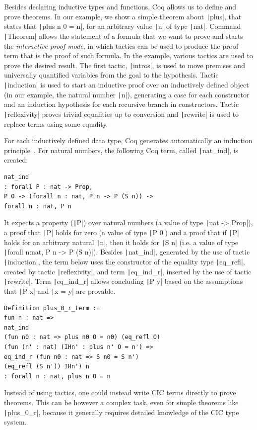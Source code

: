 \documentclass[oneside,12pt]{scrbook}
\theoremstyle{definition}
\newcommand{\coq}[1]{\texttt|#1|}
\theoremstyle{plain}
\theoremstyle{definition}
\begin{document}
Besides declaring inductive types and functions, Coq allows us to
define and prove theorems. In our example, we show a simple theorem
about \coq{plus}, that states that
\coq{plus n 0 = n}, for an arbitrary value \coq{n} of type
\coq{nat}. Command \coq{Theorem} allows the statement of a
formula that we want to prove and starts the \emph{interactive proof mode}, 
in which tactics can be used to produce the proof term that
is the proof of such formula. In the example, various tactics are
used to prove the desired result.  The first tactic, \coq{intros}, is
used to move premises and universally quantified variables from the
goal to the hypothesis. Tactic \coq{induction} is used to start an inductive
proof over an inductively defined object (in our example,
the natural number \coq{n}), generating a case for each constructor and
an induction hypothesis for each recursive branch in constructors.
Tactic \coq{reflexivity} proves trivial equalities up to conversion and
\coq{rewrite} is used to replace terms using some equality. 

For each inductively defined data type,
Coq generates automatically an induction principle~\cite[Chapter
14]{Bertot2010}. For natural numbers, the following Coq term, called
\coq{nat_ind}, is created: 
\begin{verbatim}
nat_ind
: forall P : nat -> Prop,
P O -> (forall n : nat, P n -> P (S n)) ->
forall n : nat, P n
\end{verbatim}
It expects a property (\coq{P}) over natural numbers (a value of type
\coq{nat -> Prop}), a proof that \coq{P} holds for zero (a value of
type \coq{P 0}) and a proof that if \coq{P} holds for an arbitrary
natural \coq{n}, then it holds for \coq{S n} (i.e. a value of type
\coq{forall n:nat, P n -> P (S n)}). Besides \coq{nat_ind}, generated by
the use of tactic \coq{induction}, the term below 
uses the constructor of the equality
type \coq{eq_refl}, created by tactic \coq{reflexivity}, and term
\coq{eq_ind_r}, inserted by the use of tactic \coq{rewrite}. Term
\coq{eq_ind_r} allows concluding \coq{P y} based on the assumptions
that \coq{P x} and \coq{x = y} are provable.

\begin{verbatim}
Definition plus_0_r_term :=
fun n : nat =>
nat_ind
(fun n0 : nat => plus n0 O = n0) (eq_refl O)
(fun (n' : nat) (IHn' : plus n' O = n') =>
eq_ind_r (fun n0 : nat => S n0 = S n')
(eq_refl (S n')) IHn') n
: forall n : nat, plus n O = n
\end{verbatim}  

Instead of using tactics, one could instead write CIC terms directly
to prove theorems.  This can be however a complex task, even for
simple theorems like \coq{plus_0_r}, because it generally requires
detailed knowledge of the CIC type system.
\end{document}
